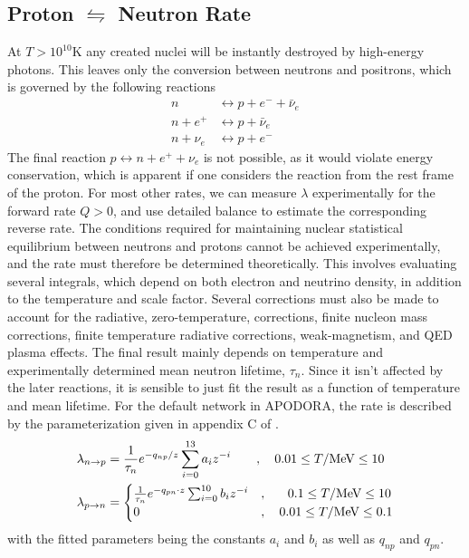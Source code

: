\subsection[Proton to neutron rate]{Proton $\leftrightharpoons$ Neutron Rate}
At $T>10^{10}$K any created nuclei will be instantly destroyed by high-energy photons. This leaves only the conversion between neutrons and positrons, which is governed by the following reactions
\begin{align}
    n &\leftrightarrow p+e^-+\bar{\nu}_e\label{eq:np1}\\
    n+e^+ &\leftrightarrow p+\bar{\nu}_e\label{eq:np2}\\
    n+\nu_e &\leftrightarrow p+e^-
    \label{eq:np3}
\end{align}
The final reaction $p\leftrightarrow n+e^++\nu_e$ is not possible, as it would violate energy conservation, which is apparent if one considers the reaction from the rest frame of the proton. For most other rates, we can measure $\lambda$ experimentally for the forward rate $Q>0$, and use detailed balance to estimate the corresponding reverse rate. The conditions required for maintaining nuclear statistical equilibrium between neutrons and protons cannot be achieved experimentally, and the rate must therefore be determined theoretically. This involves evaluating several integrals, which depend on both electron and neutrino density, in addition to the temperature and scale factor. Several corrections must also be made to account for the radiative, zero-temperature, corrections, finite nucleon mass corrections, finite temperature radiative corrections, weak-magnetism, and QED plasma effects\cite{PRIMAT}. 
The final result mainly depends on temperature and experimentally determined mean neutron lifetime, $\tau_n$. Since it isn't affected by the later reactions, it is sensible to just fit the result as a function of temperature and mean lifetime. 
For the default network in APODORA, the rate is described by the parameterization given in appendix C of \textcite{Serpico_2004}.
\begin{align}
    \lambda_{n\rightarrow p}&=\frac{1}{\tau_n}e^{-q_{np}/z}\sum_{i=0}^{13}a_i z^{-i}\quad\quad , \quad 0.01\leq T/\text{MeV} \leq 10 \\
    \lambda_{p\rightarrow n}&=
\begin{cases}
    \frac{1}{\tau_n}e^{-q_{pn}\cdot z}\sum_{i=0}^{10}b_i z^{-i}&,\quad\ \ 0.1\leq T/\text{MeV} \leq 10\\
        0&,\quad 0.01\leq T/\text{MeV} \leq 0.1
\end{cases}
\end{align}
with the fitted parameters being the constants $a_i$ and $b_i$ as well as $q_{np}$ and $q_{pn}$. 

